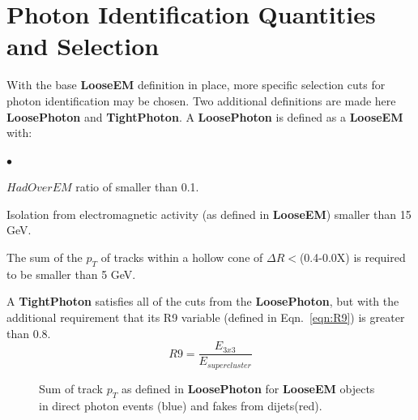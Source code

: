 \documentclass{cmspaper}
\begin{document}
\section{Photon Identification Quantities and Selection}
With the base {\bf LooseEM} definition in place, more specific selection cuts for photon identification may be chosen.  Two additional definitions are made here {\bf LoosePhoton} and {\bf TightPhoton}.  
A {\bf LoosePhoton} is defined as a {\bf LooseEM} with:
\begin{list}{$\bullet$}
 \item{$HadOverEM$ ratio of smaller than 0.1.}
\item{Isolation from electromagnetic activity (as defined in {\bf LooseEM}) smaller than 15 GeV.}
\item{The sum of the $p_{T}$ of tracks within a hollow cone of $\Delta R<$(0.4-0.0X) is required to be smaller than 5 GeV.}
\end{list}
A {\bf TightPhoton} satisfies all of the cuts from the {\bf LoosePhoton}, but with the additional requirement that its R9 variable (defined in Eqn.~\ref{eqn:R9}) is greater than 0.8.
\begin{equation}
 R9 = \frac{E_{3x3}}{E_{supercluster}}
\end{equation}\label{eqn:R9}
\begin{figure}[hbtp]
  \begin{center}
    \caption{Sum of track $p_T$ as defined in {\bf LoosePhoton} for {\bf LooseEM} objects in direct photon events (blue) and fakes
from dijets(red).}
    \label{fig:Photonid_trkiso}
  \end{center}
\end{figure}
\end{document}
